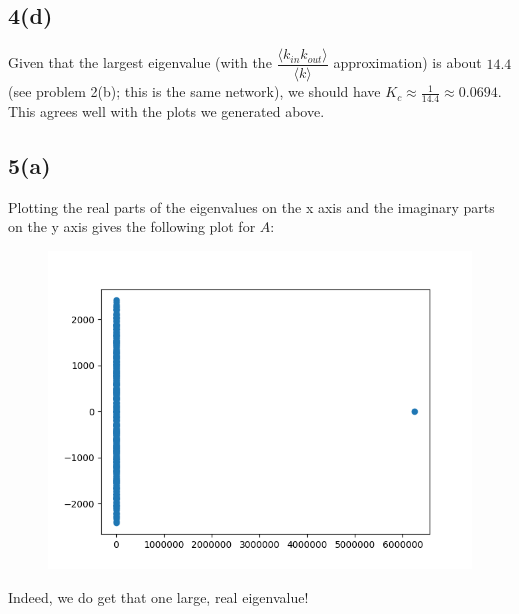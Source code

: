 \documentclass[11pt]{article}
\begin{document}
\subsection*{4(d)} Given that the largest eigenvalue (with the $\dfrac{\langle k_{in}k_{out}\rangle}{\langle k \rangle}$ approximation) is about $14.4$ (see problem 2(b); this is the same network), we should have $K_c\approx \frac{1}{14.4} \approx 0.0694.$ This agrees well with the plots we generated above.
\subsection*{5(a)} Plotting the real parts of the eigenvalues on the x axis and the imaginary parts on the y axis gives the following plot for $A$:
\begin{figure}[H]
	\includegraphics[scale=0.7]{HW/hw3p5realmat}
	\label{fig:hw3p5realmat}
\end{figure}
Indeed, we do get that one large, real eigenvalue!
\end{document}
